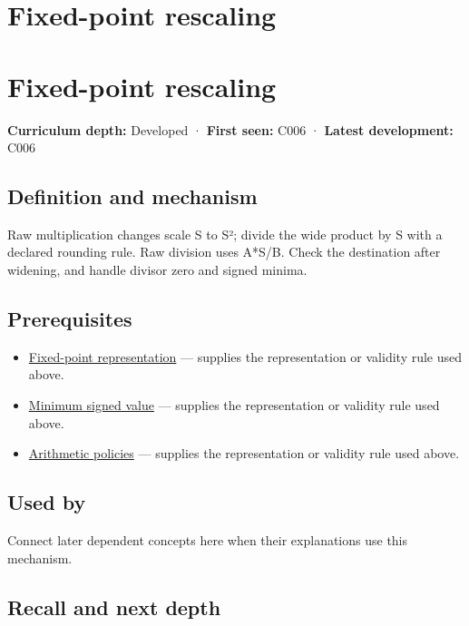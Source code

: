 \hypertarget{appendix-3333db47830f}{}
\section*{Fixed-point rescaling}
\section{Fixed-point rescaling}\label{fixed-point-rescaling}

\textbf{Curriculum depth:} Developed · \textbf{First seen:} C006 · \textbf{Latest development:} C006

\subsection{Definition and mechanism}\label{definition-and-mechanism}

Raw multiplication changes scale S to S²; divide the wide product by S with a declared rounding rule. Raw division uses A*S/B. Check the destination after widening, and handle divisor zero and signed minima.

\subsection{Prerequisites}\label{prerequisites}

\begin{itemize}
\tightlist
\item
  \hyperref[appendix-1d0dbe8924cc]{Fixed-point representation} --- supplies the representation or validity rule used above.
\item
  \hyperref[appendix-05f39b10364d]{Minimum signed value} --- supplies the representation or validity rule used above.
\item
  \hyperref[appendix-2ed044358b82]{Arithmetic policies} --- supplies the representation or validity rule used above.
\end{itemize}

\subsection{Used by}\label{used-by}

Connect later dependent concepts here when their explanations use this mechanism.

\subsection{Recall and next depth}\label{recall-and-next-depth}


